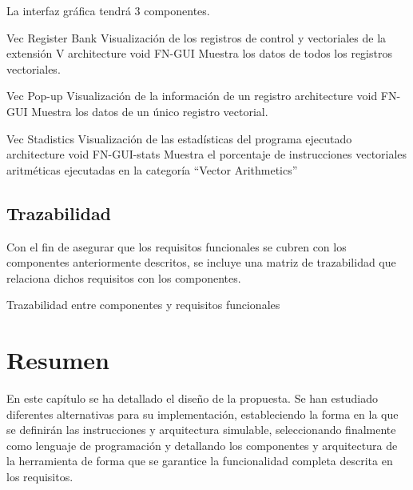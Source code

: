 La interfaz gráfica tendrá 3 componentes.

\begin{component}{Vec Register Bank} %
{Visualización de los registros de control y vectoriales de la extensión V}
{\NA}
{architecture}
{void}
{FN-GUI}
Muestra los datos de todos los registros vectoriales.
\end{component}

\begin{component}{Vec Pop-up} %
{Visualización de la información de un registro}
{\NA}
{architecture}
{void}
{FN-GUI}
Muestra los datos de un único registro vectorial.
\end{component}

\begin{component}{Vec Stadistics} %
{Visualización de las estadísticas del programa ejecutado}
{\NA}
{architecture}
{void}
{FN-GUI-stats}
Muestra el porcentaje de instrucciones vectoriales aritméticas ejecutadas en la categoría ``Vector Arithmetics''
\end{component}

\FloatBarrier

\subsection{Trazabilidad}

Con el fin de asegurar que los requisitos funcionales se cubren con los componentes anteriormente descritos, se incluye una matriz de trazabilidad que relaciona dichos requisitos con los componentes.

\begin{table}[H]
    {\traceabilityCompFN}
    \caption{Trazabilidad entre componentes y requisitos funcionales}\label{traz-3:compFN}
\end{table}

\section{Resumen}
En este capítulo se ha detallado el diseño de la propuesta. Se han estudiado diferentes alternativas para su implementación,  estableciendo la forma en la que se definirán las instrucciones y arquitectura simulable, seleccionando finalmente {\js} como lenguaje de programación y detallando los componentes y arquitectura de la herramienta de forma que se garantice la funcionalidad completa descrita en los requisitos. 
